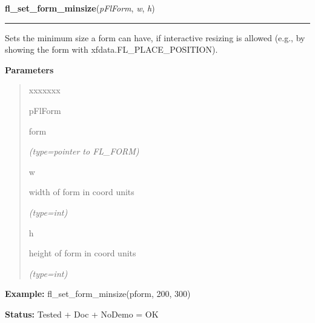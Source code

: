     \vspace{0.5ex}

\hspace{.8\funcindent}\begin{boxedminipage}{\funcwidth}

    \raggedright \textbf{fl\_set\_form\_minsize}(\textit{pFlForm}, \textit{w}, \textit{h})

    \vspace{-1.5ex}

    \rule{\textwidth}{0.5\fboxrule}
\setlength{\parskip}{2ex}
    Sets the minimum size a form can have, if interactive resizing is 
    allowed (e.g., by showing the form with xfdata.FL\_PLACE\_POSITION).

\setlength{\parskip}{1ex}
      \textbf{Parameters}
      \vspace{-1ex}

      \begin{quote}
        \begin{Ventry}{xxxxxxx}

          \item[pFlForm]

          form

            {\it (type=pointer to FL\_FORM)}

          \item[w]

          width of form in coord units

            {\it (type=int)}

          \item[h]

          height of form in coord units

            {\it (type=int)}

        \end{Ventry}

      \end{quote}

\textbf{Example:} fl\_set\_form\_minsize(pform, 200, 300)



\textbf{Status:} Tested + Doc + NoDemo = OK



    \end{boxedminipage}

    \label{xformslib:flbasic:fl_set_form_maxsize}

